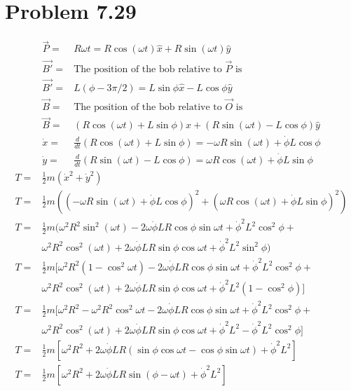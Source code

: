 \documentclass[12pt, a4paper]{article}
\begin{document}
\section*{Problem 7.29}
\begin{align*}
\vec{P} =& R\omega t = R\cos(\omega t)\hat{x} + R\sin(\omega t)\hat{y}
\\
\vec{B'} =& \text{The position of the bob relative to $\vec{P}$ is}
\\
\vec{B'} =& L(\phi-3\pi/2) = L\sin\phi\hat{x} - L\cos\phi\hat{y}
\\
\vec{B} =& \text{The position of the bob relative to $\vec{O}$ is}
\\
\vec{B} =& (R\cos(\omega t)+L\sin\phi)\hat{x} + (R\sin(\omega t)-L\cos\phi)\hat{y}
\\
\dot{x} =& \frac{d}{dt}(R\cos(\omega t)+L\sin\phi) = -\omega R\sin(\omega t) + \dot{\phi}L\cos\phi
\\
\dot{y} =& \frac{d}{dt}(R\sin(\omega t)-L\cos\phi) = \omega R\cos(\omega t) + \dot{\phi}L\sin\phi
\end{align*}
\begin{align*}
T =& \tfrac{1}{2}m(\dot{x}^2+\dot{y}^2)
\\
T =& \tfrac{1}{2}m((-\omega R\sin(\omega t) + \dot{\phi}L\cos\phi)^2+(\omega R\cos(\omega t) + \dot{\phi}L\sin\phi)^2)
\\
T =& \tfrac{1}{2}m(
\omega^2R^2\sin^2(\omega t) - 2\omega\dot{\phi}LR\cos\phi\sin\omega t + \dot{\phi}^2L^2\cos^2\phi+\\
&\omega^2R^2\cos^2(\omega t) + 2\omega\dot{\phi}LR\sin\phi\cos\omega t + \dot{\phi}^2L^2\sin^2\phi)
\\
T =& \tfrac{1}{2}m[
\omega^2R^2(1-\cos^2\omega t) - 2\omega\dot{\phi}LR\cos\phi\sin\omega t + \dot{\phi}^2L^2\cos^2\phi+\\
&\omega^2R^2\cos^2(\omega t) + 2\omega\dot{\phi}LR\sin\phi\cos\omega t + \dot{\phi}^2L^2(1-\cos^2\phi)]
\\
T =& \tfrac{1}{2}m[
\omega^2R^2-\omega^2R^2\cos^2\omega t - 2\omega\dot{\phi}LR\cos\phi\sin\omega t + \dot{\phi}^2L^2\cos^2\phi+\\
&\omega^2R^2\cos^2(\omega t) + 2\omega\dot{\phi}LR\sin\phi\cos\omega t + \dot{\phi}^2L^2-\dot{\phi}^2L^2\cos^2\phi]
\\
T =& \tfrac{1}{2}m[
\omega^2R^2 + 2\omega\dot{\phi}LR(\sin\phi\cos\omega t - \cos\phi\sin\omega t) + \dot{\phi}^2L^2]
\\
T =& \tfrac{1}{2}m[
\omega^2R^2 + 2\omega\dot{\phi}LR\sin(\phi-\omega t) + \dot{\phi}^2L^2]
\end{align*}
\end{document}
